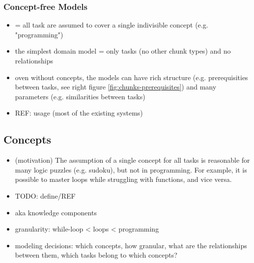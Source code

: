 \subsubsection{\textbf{Concept-free Models}}
\begin{itemize}
\item = all task are assumed to cover a single indivisible concept (e.g. "programming")
\item the simplest domain model = only tasks (no other chunk types) and no relationships
\item oven without concepts, the models can have
  rich structure (e.g. prerequisities between tasks,
    see right figure \ref{fig:chunks-prerequisites})
  and many parameters (e.g. similarities between tasks)
\item REF: usage (most of the existing systems)
\end{itemize}


\subsection{Concepts}

\begin{itemize}
\item (motivation) The assumption of a single concept for all tasks is
  reasonable for many logic puzzles (e.g. sudoku), but not in programming.
  For example, it is possible to master loops while struggling with functions,
  and vice versa.
\item TODO: define/REF
\item aka knowledge components \cite{knowledge-components}
\item granularity: while-loop < loops < programming
\item modeling decisions: which concepts, how granular, what are the
  relationships between them, which tasks belong to which concepts?
\end{itemize}

